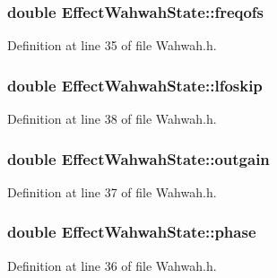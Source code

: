 \subsubsection[{\texorpdfstring{freqofs}{freqofs}}]{\setlength{\rightskip}{0pt plus 5cm}double Effect\+Wahwah\+State\+::freqofs}\hypertarget{class_effect_wahwah_state_a0c342b9ceee58149e5148a34ff1d50ca}{}\label{class_effect_wahwah_state_a0c342b9ceee58149e5148a34ff1d50ca}


Definition at line 35 of file Wahwah.\+h.

\subsubsection[{\texorpdfstring{lfoskip}{lfoskip}}]{\setlength{\rightskip}{0pt plus 5cm}double Effect\+Wahwah\+State\+::lfoskip}\hypertarget{class_effect_wahwah_state_aee4c957a0bad04f5c955fc7959b6c758}{}\label{class_effect_wahwah_state_aee4c957a0bad04f5c955fc7959b6c758}


Definition at line 38 of file Wahwah.\+h.

\subsubsection[{\texorpdfstring{outgain}{outgain}}]{\setlength{\rightskip}{0pt plus 5cm}double Effect\+Wahwah\+State\+::outgain}\hypertarget{class_effect_wahwah_state_a6dbd45874a0bd6b33ac49a4d22938d1c}{}\label{class_effect_wahwah_state_a6dbd45874a0bd6b33ac49a4d22938d1c}


Definition at line 37 of file Wahwah.\+h.

\subsubsection[{\texorpdfstring{phase}{phase}}]{\setlength{\rightskip}{0pt plus 5cm}double Effect\+Wahwah\+State\+::phase}\hypertarget{class_effect_wahwah_state_a7a6f038090e6edbed001bbf70c43b2a9}{}\label{class_effect_wahwah_state_a7a6f038090e6edbed001bbf70c43b2a9}


Definition at line 36 of file Wahwah.\+h.

